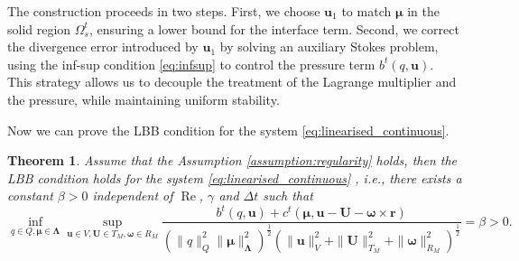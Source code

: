 \documentclass{article}
\newcommand{\bU}{{\mathbf{U}}}
\newcommand{\bu}{{\mathbf{u}}}
\newcommand{\bomega}{{\boldsymbol{\omega}}}
\newcommand{\Reynolds}{{\operatorname{Re}}}
\newtheorem{theorem}{Theorem}[section]
\begin{document}
The construction proceeds in two steps. First, we choose $\bu_1$ to match $\boldsymbol{\mu}$ in the solid region $\Omega_s^t$, ensuring a lower bound for the interface term. Second, we correct the divergence error introduced by $\bu_1$ by solving an auxiliary Stokes problem, using the inf-sup condition \eqref{eq:infsup} to control the pressure term $b^t(q,\bu)$. This strategy allows us to decouple the treatment of the Lagrange multiplier and the pressure, while maintaining uniform stability.

Now we can prove the LBB condition for the system \eqref{eq:linearised_continuous}.
\begin{theorem}
    Assume that the Assumption \ref{assumption:regularity} holds, then the LBB condition holds for the system \eqref{eq:linearised_continuous} , i.e., there exists a constant $\beta > 0$ independent of $\Reynolds$, $\gamma$ and $\Delta t$ such that
    \begin{equation}
        \inf_{{q}\in Q, \boldsymbol{\mu}\in\boldsymbol{\Lambda}} \sup_{\bu\in V,{\bU}\in T_M,{\bomega}\in R_M} \frac{{b}^t({q},\bu)+{c}^t({\boldsymbol{\mu}},\bu - {\bU} - {\bomega}\times\mathbf{r})}{(\|{q}\|_Q^2\|{\boldsymbol{\mu}}\|_{\boldsymbol{\Lambda}}^2)^\frac12 (\|\bu\|_V^2 + \|{\bU}\|_{T_M}^2 + \|{\bomega}\|_{R_M}^2)^\frac12} = \beta > 0.
    \end{equation}
\end{theorem}
\end{document}
